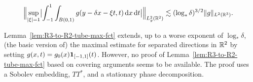 \begin{lemma}[{\cite[Lemma 1.4]{MR1173929}}]
\label{lem:R3-to-R2-tube-max-fct}
\begin{equation}
\label{eq:R3-to-R2-tube-max-fct}
\norm[\Big]{\sup_{\abs{\xi}=1} \abs[\big]{ \int_{-1}^{1} \int_{B(0,1)} g(y-\delta x-\xi t,t) \dif x \dif t} }_{L^{2}_{y}(\R^{2})}
\lesssim
(\log_{*} \delta)^{3/2}
\norm{g}_{L^{2}(\R^{3})}.
\end{equation}
\end{lemma}
Lemma~\ref{lem:R3-to-R2-tube-max-fct} extends, up to a worse exponent of $\log_{*}\delta$, (the basic version of) the maximal estimate for separated directions in $\mathbb{R}^{2}$ by setting $g(x,t) = g_{0}(x) \mathbf{1}_{[-1,1]}(t)$.
However, no proof of Lemma~\ref{lem:R3-to-R2-tube-max-fct} based on covering arguments seems to be available.
The proof uses a Sobolev embedding, $TT^{*}$, and a stationary phase decomposition.
